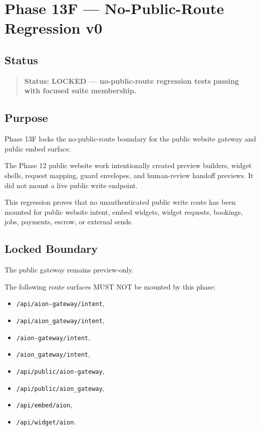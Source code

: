 \section{Phase 13F --- No-Public-Route Regression v0}
\label{sec:aion-phase13f-no-public-route-regression-v0}

\subsection{Status}

\begin{quote}
\textbf{Status: LOCKED --- no-public-route regression tests passing with focused suite membership.}
\end{quote}

\subsection{Purpose}

Phase 13F locks the no-public-route boundary for the public website gateway and public embed surface.

The Phase 12 public website work intentionally created preview builders, widget shells, request mapping, guard envelopes, and human-review handoff previews. It did not mount a live public write endpoint.

This regression proves that no unauthenticated public write route has been mounted for public website intent, embed widgets, widget requests, bookings, jobs, payments, escrow, or external sends.

\subsection{Locked Boundary}

The public gateway remains preview-only.

The following route surfaces MUST NOT be mounted by this phase:

\begin{itemize}
  \item \texttt{/api/aion-gateway/intent},
  \item \texttt{/api/aion\_gateway/intent},
  \item \texttt{/aion-gateway/intent},
  \item \texttt{/aion\_gateway/intent},
  \item \texttt{/api/public/aion-gateway},
  \item \texttt{/api/public/aion\_gateway},
  \item \texttt{/api/embed/aion},
  \item \texttt{/api/widget/aion}.
\end{itemize}

